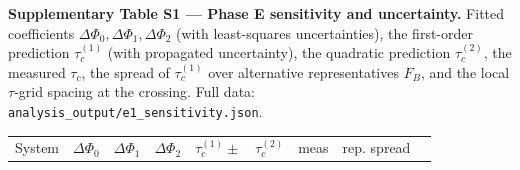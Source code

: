 \documentclass[
]{article}
\begin{document}
\textbf{Supplementary Table S1 --- Phase E sensitivity and uncertainty.}
Fitted coefficients \(\Delta\Phi_0,\Delta\Phi_1,\Delta\Phi_2\) (with
least-squares uncertainties), the first-order prediction
\(\tau_c^{(1)}\) (with propagated uncertainty), the quadratic prediction
\(\tau_c^{(2)}\), the measured \(\tau_c\), the spread of
\(\tau_c^{(1)}\) over alternative representatives \(F_B\), and the local
\(\tau\)-grid spacing at the crossing. Full data:
\texttt{analysis\_output/e1\_sensitivity.json}.

{\def\LTcaptype{none} %
\begin{longtable}[]{@{}
  >{\raggedright\arraybackslash}p{}
  >{\raggedright\arraybackslash}p{}
  >{\raggedright\arraybackslash}p{}
  >{\raggedright\arraybackslash}p{}
  >{\raggedright\arraybackslash}p{}
  >{\raggedright\arraybackslash}p{}
  >{\raggedright\arraybackslash}p{}
  >{\raggedright\arraybackslash}p{}
  >{\raggedright\arraybackslash}p{}@{}}
\toprule\noalign{}
\begin{minipage}[b]{\linewidth}\raggedright
System
\end{minipage} & \begin{minipage}[b]{\linewidth}\raggedright
\(\Delta\Phi_0\)
\end{minipage} & \begin{minipage}[b]{\linewidth}\raggedright
\(\Delta\Phi_1\)
\end{minipage} & \begin{minipage}[b]{\linewidth}\raggedright
\(\Delta\Phi_2\)
\end{minipage} & \begin{minipage}[b]{\linewidth}\raggedright
\(\tau_c^{(1)}\pm\)
\end{minipage} & \begin{minipage}[b]{\linewidth}\raggedright
\(\tau_c^{(2)}\)
\end{minipage} & \begin{minipage}[b]{\linewidth}\raggedright
meas
\end{minipage} & \begin{minipage}[b]{\linewidth}\raggedright
rep. spread
\end{minipage} & \begin{minipage}[b]{\linewidth}\raggedright

\end{minipage}
\end{longtable}}
\end{document}

